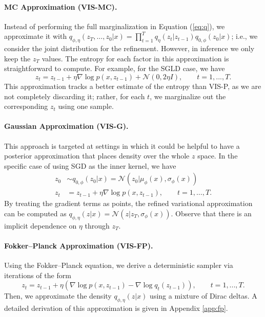     \paragraph{MC Approximation (VIS-MC).}
     Instead of performing the full marginalization in Equation (\ref{eq:q}), we approximate it with  { $q_{\phi,\eta}(z_T,\ldots, z_0|x) = \prod_{t=1}^T q_\eta(z_t | z_{t-1}) q_{0,\phi}(z_0|x)$; i.e., we consider the joint distribution for the refinement. However, in inference we only keep the $z_T$ values}. The entropy for each factor in this 
    approximation is straightforward to compute. For 
    example, for the SGLD case, we have
    {\bf
    $$ 
    z_t = z_{t-1} + \eta \nabla \log p(x, z_{t-1}) + \mathcal{N}(0, 2\eta I),\qquad  t=1, ..., T.
    $$
    }
This approximation tracks a better estimate of the entropy than 
    VIS-P, as we are not completely discarding it; rather, for each $t$, we marginalize out the corresponding $z_t$ using one sample.
          \paragraph{Gaussian Approximation (VIS-G).} 
          This approach is targeted at settings in which it could be helpful to have a posterior approximation that places density over the whole
        $z$ space. In the specific case of using SGD as the inner kernel, we have
\begin{align*}
z_0 &\sim q_{0,\phi}(z_0|x) = \mathcal{N}(z_0 | \mu_\phi(x), \sigma_\phi(x))\\
z_t &= z_{t-1} + \eta \nabla \log p(x, z_{t-1}), \qquad t=1,\ldots,T.
\end{align*}
By treating the gradient terms as points, the refined variational approximation can be computed as
$ q_{\phi,\eta}(z|x) = \mathcal{N}(z | z_T, \sigma_\phi(x))$. Observe 
that there is an implicit dependence on $\eta$ through $z_T$.

    
      \paragraph{Fokker--Planck Approximation (VIS-FP).} 
      Using the Fokker--Planck equation, we derive 
    a deterministic sampler via iterations of the form
\begin{equation*}
z_{t} = z_{t-1} + \eta (\nabla \log p(x, z_{t-1}) - \nabla \log q_t (z_{t-1})),\qquad  t=1, ..., T{.}
\end{equation*}
Then, we approximate the density $q_{\phi,\eta}(z|x)$ using a mixture of Dirac deltas. A detailed derivation of this approximation is given in Appendix \ref{app:fp}. 


